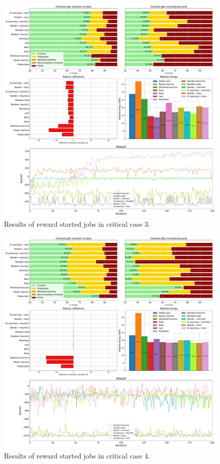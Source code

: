 \begin{figure}[!htb]
    \centering
    \includegraphics[scale=0.29]{Images/Learning_compensations/reward_started_profile_worst_workload_1_with_noise_state_delta.pdf}
    \caption{Results of reward started jobs in critical case 3.}
    \label{fig:started_reward_results_critical_3}
\end{figure}

\begin{figure}[!htb]
    \centering
    \includegraphics[scale=0.29]{Images/Learning_compensations/reward_started_profile_worst_workload_2_with_noise_state_delta.pdf}
    \caption{Results of reward started jobs in critical case 4.}
    \label{fig:started_reward_results_critical_4}
\end{figure}

